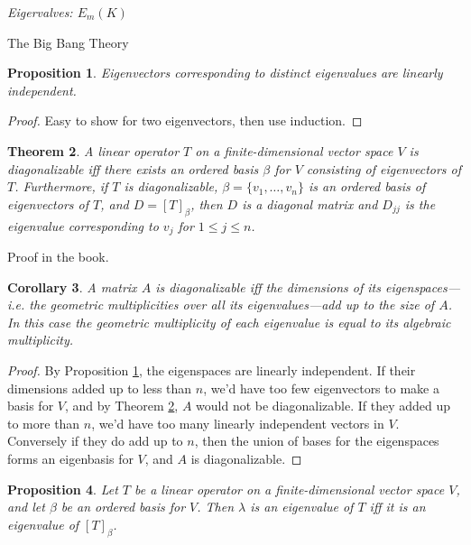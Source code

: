 \documentclass[12pt]{article}
\theoremstyle{plain}
\newtheorem{theorem}{Theorem}
\newtheorem{corollary}[theorem]{Corollary}
\newtheorem{proposition}[theorem]{Proposition}
\theoremstyle{definition}
\theoremstyle{remark}
\begin{document}
\epigraph{\textit{Eigervalves: $E_m(K)$}}{The Big Bang Theory}

\begin{proposition}\label{eigenindependence}
Eigenvectors corresponding to distinct eigenvalues are linearly independent.
\end{proposition}

\begin{proof}
Easy to show for two eigenvectors, then use induction.
\end{proof}

\begin{mdframed}
\begin{theorem}\label{diagonalizable}
A linear operator $T$ on a finite-dimensional vector space $V$ is diagonalizable iff there exists an ordered basis $\beta$ for $V$ consisting of eigenvectors of $T$. Furthermore, if $T$ is diagonalizable, $\beta = \{v_1,\ldots, v_n\}$ is an ordered basis of eigenvectors of $T$, and $D = [T]_\beta$, then $D$ is a diagonal matrix and $D_{jj}$ is the eigenvalue corresponding to $v_j$ for $1 \leq j \leq n$.
\end{theorem}
\end{mdframed}

Proof in the book.

\begin{corollary}
A matrix $A$ is diagonalizable iff the dimensions of its eigenspaces---i.e. the geometric multiplicities over all its eigenvalues---add up to the size of $A$. In this case the geometric multiplicity of each eigenvalue is equal to its algebraic multiplicity.
\end{corollary}

\begin{proof}
By Proposition \ref{eigenindependence}, the eigenspaces are linearly independent. If their dimensions added up to less than $n$, we'd have too few eigenvectors to make a basis for $V$, and by Theorem \ref{diagonalizable}, $A$ would not be diagonalizable. If they added up to more than $n$, we'd have too many linearly independent vectors in $V$. Conversely if they do add up to $n$, then the union of bases for the eigenspaces forms an eigenbasis for $V$, and $A$ is diagonalizable.
\end{proof}

\begin{proposition}
Let $T$ be a linear operator on a finite-dimensional vector space $V$, and let $\beta$ be an ordered basis for $V$. Then $\lambda$ is an eigenvalue of $T$ iff it is an eigenvalue of $[T]_\beta$.
\end{proposition}
\end{document}
